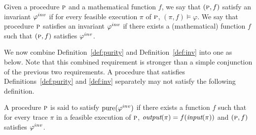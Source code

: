 
\begin{definition}[Invariant]
\label{def:inv}
Given a procedure $\textsc{p}$ and a mathematical function $f$, we say that $(\textsc{p},f)$ satisfy
an invariant $\varphi^{inv}$ if for every feasible execution $\pi$ of $\textsc{p}$, $(\pi,f) \models \varphi$.
We say that procedure $\textsc{p}$ satisfies an invariant $\varphi^{inv}$ if there exists a (mathematical)
function $f$ such that $(\textsc{p},f)$ satisfies $\varphi^{inv}$.
\end{definition}

We now combine Definition~\ref{def:purity} and Definition~\ref{def:inv} into one as below.
Note that this combined requirement is stronger than a simple conjunction of the previous
two requirements. A procedure that satisfies Definitions~\ref{def:purity} and \ref{def:inv}
separately may not satisfy the following definition.
\begin{definition}
\label{def:pureinv}
A procedure $\textsc{p}$ is said to satisfy $\mathrm{pure}(\varphi^{inv})$ if
there exists a function $f$ such that for every trace $\pi$ in a feasible execution of $\textsc{p}$,
$\textit{output}(\pi) = f(\textit{input}(\pi))$ and $(\textsc{p},f)$ satisfies $\varphi^{inv}$.
\end{definition}
